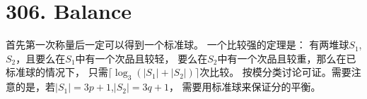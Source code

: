 \section{306. Balance}
首先第一次称量后一定可以得到一个标准球。
一个比较强的定理是：
有两堆球$S_1$, $S_2$，且要么在$S_1$中有一个次品且较轻，
要么在$S_2$中有一个次品且较重，那么在已标准球的情况下，
只需$\lceil \log_3(|S_1| + |S_2|) \rceil$次比较。
按模分类讨论可证。需要注意的是，若$|S_1| = 3p + 1$,$|S_2| = 3q + 1$，
需要用标准球来保证分的平衡。
